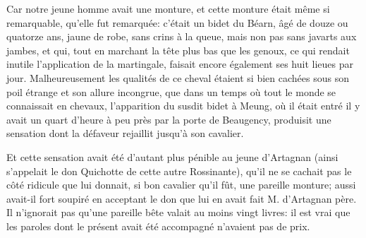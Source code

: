 Car notre jeune homme avait une monture, et cette monture était même si remarquable, qu'elle fut remarquée: c'était un bidet du Béarn, âgé de douze ou quatorze ans, jaune de robe, sans crins à la queue, mais non pas sans javarts aux jambes, et qui, tout en marchant la tête plus bas que les genoux, ce qui rendait inutile l'application de la martingale, faisait encore également ses huit lieues par jour. Malheureusement les qualités de ce cheval étaient si bien cachées sous son poil étrange et son allure incongrue, que dans un temps où tout le monde se connaissait en chevaux, l'apparition du susdit bidet à Meung, où il était entré il y avait un quart d'heure à peu près par la porte de Beaugency, produisit une sensation dont la défaveur rejaillit jusqu'à son cavalier. 

Et cette sensation avait été d'autant plus pénible au jeune d'Artagnan (ainsi s'appelait le don Quichotte de cette autre Rossinante), qu'il ne se cachait pas le côté ridicule que lui donnait, si bon cavalier qu'il fût, une pareille monture; aussi avait-il fort soupiré en acceptant le don que lui en avait fait M. d'Artagnan père. Il n'ignorait pas qu'une pareille bête valait au moins vingt livres: il est vrai que les paroles dont le présent avait été accompagné n'avaient pas de prix. 

